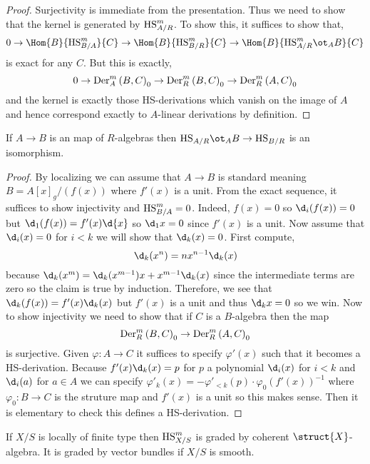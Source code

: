 \documentclass[12pt]{article}
\begin{document}
\begin{proof}
Surjectivity is immediate from the presentation. Thus we need to show that the kernel is generated by $\HS_{A/R}^m$. To show this, it suffices to show that,
\[ 0 \to \Hom{B}{\HS_{B/A}^m}{C} \to \Hom{B}{\HS_{B/R}^m}{C} \to \Hom{B}{\HS_{A/R}^m \ot_A B}{C} \] 
is exact for any $C$. But this is exactly,
\[ 0 \to \HSDer{A}{m}{B}{C}_0 \to \HSDer{R}{m}{B}{C}_0 \to \HSDer{R}{m}{A}{C}_0 \]
and the kernel is exactly those HS-derivations which vanish on the image of $A$ and hence correspond exactly to $A$-linear derivations by definition.
\end{proof}

\begin{lemma}
If $A \to B$ is an \etale map of $R$-algebras then $\HS_{A/R} \ot_A B \to \HS_{B/R}$ is an isomorphism.
\end{lemma}

\begin{proof}
By localizing we can assume that $A \to B$ is standard \etale meaning $B = A[x]_g/(f(x))$ where $f'(x)$ is a unit. From the exact sequence, it suffices to show injectivity and $\HS_{B/A}^m = 0$. Indeed, $f(x) = 0$ so $\d_i{(f(x))} = 0$ but $\d_1(f(x)) = f'(x) \d{x}$ so $\d_1{x} = 0$ since $f'(x)$ is a unit. Now assume that $\d_i(x) = 0$ for $i < k$ we will show that $\d_{k}(x) = 0$. First compute,
\[ \d_k(x^n) = n x^{n-1} \d_k(x) \]
because $\d_k(x^m) = \d_k(x^{m-1}) x + x^{m-1} \d_k(x)$ since the intermediate terms are zero so the claim is true by induction. Therefore, we see that $\d_k(f(x)) = f'(x) \d_k(x)$ but $f'(x)$ is a unit and thus $\d_k{x} = 0$ so we win. Now to show injectivity we need to show that if $C$ is a $B$-algebra then the map
\[ \HSDer{R}{m}{B}{C}_0 \to \HSDer{R}{m}{A}{C}_0 \]
is surjective. Given $\varphi : A \to C$ it suffices to specify $\varphi'(x)$ such that it becomes a HS-derivation. Because $f'(x) \d_k(x) = p$ for $p$ a polynomial $\d_i(x)$ for $i < k$ and $\d_i(a)$ for $a \in A$ we can specify $\varphi'_k(x) = - \varphi'_{<k}(p) \cdot \varphi_0(f'(x))^{-1}$ where $\varphi_0 : B \to C$ is the struture map and $f'(x)$ is a unit so this makes sense. Then it is elementary to check this defines a HS-derivation.	 
\end{proof}

\begin{prop}
If $X/S$ is locally of finite type then $\HS_{X/S}^m$ is graded by coherent $\struct{X}$-algebra. It is graded by vector bundles if $X/S$ is smooth.
\end{prop}
\end{document}
